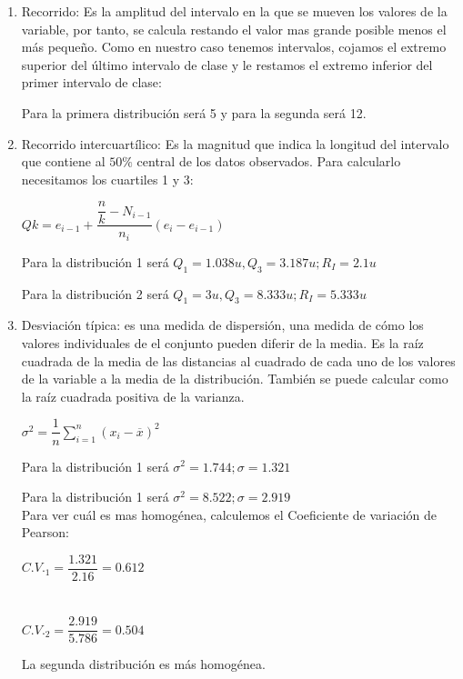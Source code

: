 \begin{enumerate}
	\item Recorrido: Es la amplitud del intervalo en la que se mueven los valores de la variable, por tanto, se calcula restando el valor mas grande posible menos el más pequeño. Como en nuestro caso tenemos intervalos, cojamos el extremo superior del último intervalo de clase y le restamos el extremo inferior del primer intervalo de clase:
	
	Para la primera distribución será 5 y para la segunda será 12.
	\item Recorrido intercuartílico: Es la magnitud que indica la longitud del intervalo que contiene al $50\%$ central de los datos observados. Para calcularlo necesitamos los cuartiles 1 y 3:
	
	\begin{center}
		$Qk = e_{i-1} + \dfrac{\dfrac{n}{k} - N_{i-1}}{n_i}(e_i-e_{i-1})$
	\end{center}
	
	Para la distribución 1 será $Q_1 = 1.038 u, Q_3 = 3.187 u; R_I = 2.1 u$
	
	Para la distribución 2 será $Q_1 = 3 u, Q_3 = 8.333 u; R_I = 5.333 u$\\
	
	\item Desviación típica: es una medida de dispersión, una medida de cómo los valores individuales de el conjunto pueden diferir de la media. Es la raíz cuadrada de la media de las distancias al cuadrado de cada uno de los valores de la variable a la media de la distribución. También se puede calcular como la raíz cuadrada positiva de la varianza.
	\begin{center}
		$\sigma^2 = \dfrac{1}{n} \sum_{i=1}^{n}(x_i-\overline{x})^2$
	\end{center}
	
	Para la distribución 1 será $\sigma^2 = 1.744; \sigma = 1.321$
	
	Para la distribución 1 será $\sigma^2 = 8.522; \sigma = 2.919$\\
	
	
	Para ver cuál es mas homogénea, calculemos el Coeficiente de variación de Pearson:
	
	$C.V._1 = \dfrac{1.321}{2.16}= 0.612$ \\
	\\
	\\
	$C.V._2 = \dfrac{2.919}{5.786}= 0.504$
	
	La segunda distribución es más homogénea.
	
\end{enumerate}